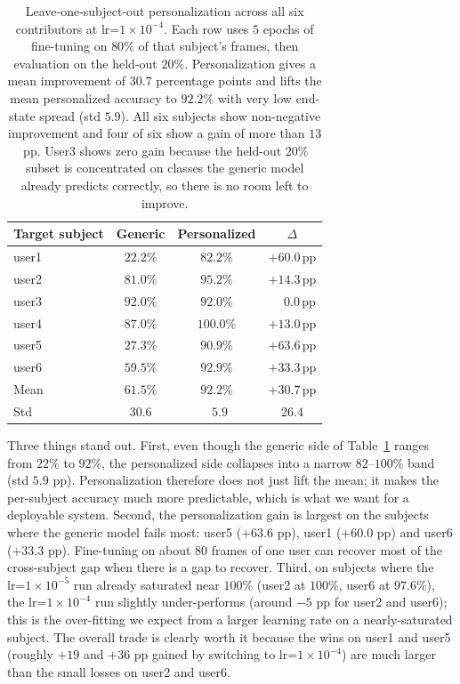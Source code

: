 \documentclass[12pt,a4paper]{article}
\begin{document}
\begin{table}[H]
  \centering
  \footnotesize
  \begin{tabular}{lccc}
    \toprule
    Target subject & Generic & Personalized & $\Delta$ \\
    \midrule
    user1 & $22.2\%$ & $82.2\%$  & $+60.0$\,pp \\
    user2 & $81.0\%$ & $95.2\%$  & $+14.3$\,pp \\
    user3 & $92.0\%$ & $92.0\%$  & $\phantom{+}0.0$\,pp \\
    user4 & $87.0\%$ & $100.0\%$ & $+13.0$\,pp \\
    user5 & $27.3\%$ & $90.9\%$  & $+63.6$\,pp \\
    user6 & $59.5\%$ & $92.9\%$  & $+33.3$\,pp \\
    \midrule
    Mean  & $\mathbf{61.5\%}$ & $\mathbf{92.2\%}$ & $\mathbf{+30.7}$\,pp \\
    Std   & $30.6$ & $\phantom{0}5.9$ & $26.4$ \\
    \bottomrule
  \end{tabular}
  \caption{Leave-one-subject-out personalization across all
  six contributors at lr=$1\times 10^{-4}$. Each row uses $5$
  epochs of fine-tuning on $80\%$ of that subject's frames,
  then evaluation on the held-out $20\%$. Personalization
  gives a mean improvement of $30.7$ percentage points and
  lifts the mean personalized accuracy to $92.2\%$ with very
  low end-state spread (std $5.9$). All six subjects show
  non-negative improvement and four of six show a gain of
  more than $13$\,pp. User3 shows zero gain because the
  held-out $20\%$ subset is concentrated on classes the
  generic model already predicts correctly, so there is no
  room left to improve.}
  \label{tab:beta}
\end{table}

Three things stand out. First, even though the generic side
of Table~\ref{tab:beta} ranges from $22\%$ to $92\%$, the
personalized side collapses into a narrow $82$--$100\%$ band
(std $5.9$ pp). Personalization therefore does not just lift
the mean; it makes the per-subject accuracy much more
predictable, which is what we want for a deployable system.
Second, the personalization gain is largest on the subjects
where the generic model fails most: user5 ($+63.6$ pp), user1
($+60.0$ pp) and user6 ($+33.3$ pp). Fine-tuning on about
$80$ frames of one user can recover most of the cross-subject
gap when there is a gap to recover. Third, on subjects where
the lr=$1\times 10^{-5}$ run already saturated near $100\%$
(user2 at $100\%$, user6 at $97.6\%$), the lr=$1\times 10^{-4}$
run slightly under-performs (around $-5$ pp for user2 and
user6); this is the over-fitting we expect from a larger
learning rate on a nearly-saturated subject. The overall
trade is clearly worth it because the wins on user1 and user5
(roughly $+19$ and $+36$ pp gained by switching to
lr=$1\times 10^{-4}$) are much larger than the small losses
on user2 and user6.
\end{document}
